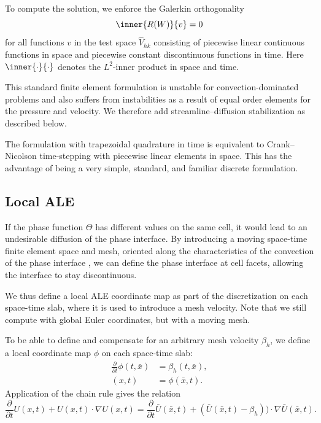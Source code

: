 To compute the solution, we enforce the Galerkin orthogonality
\begin{equation}
  \inner{R(W)}{v} = 0
\end{equation}
for all functions $v$ in the test space $\hat{V}_{hk}$ consisting of
piecewise linear continuous functions in space and piecewise constant
discontinuous functions in time. Here $\inner{\cdot}{\cdot}$ denotes
the $L^2$-inner product in space and time.

This standard finite element formulation is unstable for
convection-dominated problems and also suffers from instabilities as a
result of equal order elements for the pressure and velocity. We
therefore add streamline--diffusion stabilization as described below.

The \cgone{}\cgone{} formulation with trapezoidal quadrature in time
is equivalent to Crank--Nicolson time-stepping with piecewise linear
elements in space. This has the advantage of being a very simple,
standard, and familiar discrete formulation.

\subsection{Local ALE}
\label{sec:hoffman-2:ale}

If the phase function $\Theta$ has different values on the same cell,
it would lead to an undesirable diffusion of the phase interface. By
introducing a moving space-time finite element space and mesh,
oriented along the characteristics of the convection of the phase
interface \citep[section concerning ``The characteristic Galerkin
  method'']{ErikssonEstepHansboEtAl1996}, we can define the phase
interface at cell facets, allowing the interface to stay
discontinuous.

We thus define a local ALE coordinate map as part of the
discretization on each space-time slab, where it is used to introduce
a mesh velocity. Note that we still compute with global Euler
coordinates, but with a moving mesh.

To be able to define and compensate for an arbitrary mesh velocity
$\beta_h$, we define a local coordinate map $\phi$ on each space-time
slab:
\begin{equation}
  \begin{split}\label{eq:ALEmap}
    \frac{\partial}{\partial t} \phi(t, \bar{x}) &= \beta_h(t, \bar{x}),
    \\
    (x, t) &= \phi(\bar{x}, t).
  \end{split}
\end{equation}
Application of the chain rule gives the relation
\begin{equation}
  \label{eq:ALE2}
  \frac{\partial}{\partial t} U(x,t) + U(x,t) \cdot \nabla U(x,t) = \frac{\partial}{\partial t} \bar{U}(\bar{x},t) +
  (\bar{U}(\bar{x},t) - \beta_h)) \cdot \nabla \bar{U}(\bar{x},t).
\end{equation}


